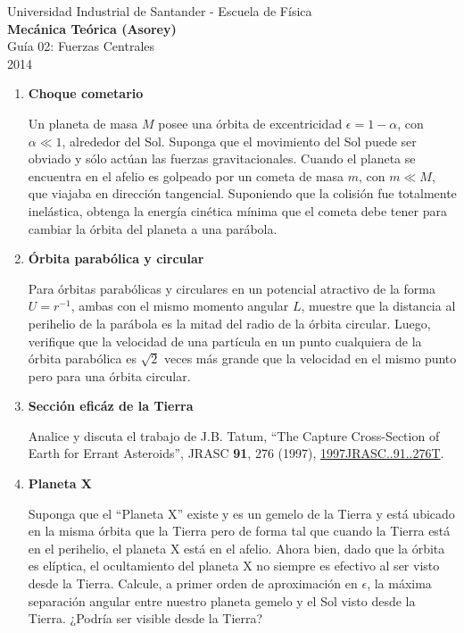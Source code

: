 \documentclass[a4paper,12pt]{article}
\begin{document}
\begin{center}
  {\small{Universidad Industrial de Santander - Escuela de Física}}\\
  {\bf{Mecánica Teórica (Asorey)}}\\
  \vspace{0.4cm}
  Guía 02: Fuerzas Centrales\\ 2014
\end{center}
\renewcommand{\labelenumi}{\arabic{enumi})}
\renewcommand{\labelenumii}{\arabic{enumii})}

\begin{enumerate}
  \item {\bf{Choque cometario}}

    Un planeta de masa $M$ posee una órbita de excentricidad $\epsilon = 1
    - \alpha$, con $\alpha \ll 1$, alrededor del Sol. Suponga que el
    movimiento del Sol puede ser obviado y sólo actúan las fuerzas
    gravitacionales. Cuando el planeta se encuentra en el afelio es
    golpeado por un cometa de masa $m$, con $m \ll M$, que viajaba en
    dirección tangencial. Suponiendo que la colisión fue totalmente
    inelástica, obtenga la energía cinética mínima que el cometa debe
    tener para cambiar la órbita del planeta a una parábola.

  \item {\bf{Órbita parabólica y circular}}

    Para órbitas parabólicas y circulares en un potencial atractivo de la
    forma $U=r^{-1}$, ambas con el mismo momento angular $L$, muestre que
    la distancia al perihelio de la parábola es la mitad del radio de la
    órbita circular. Luego, verifique que la velocidad de una partícula en
    un punto cualquiera de la órbita parabólica es $\sqrt{2}$ veces más
    grande que la velocidad en el mismo punto pero para una órbita
    circular.

  \item {\bf{Sección eficáz de la Tierra}}

    Analice y discuta el trabajo de J.B. Tatum, ``The Capture
    Cross-Section of Earth for Errant Asteroids'', JRASC {\bf 91}, 276
    (1997),
    \href{http://adsabs.harvard.edu/abs/1997JRASC..91..276T}{1997JRASC..91..276T}.

  \item {\bf{Planeta X}} \label{X}

    Suponga que el ``Planeta X'' existe y es un gemelo de la Tierra y está
    ubicado en la misma órbita que la Tierra pero de forma tal que cuando
    la Tierra está en el perihelio, el planeta X está en el afelio. Ahora
    bien, dado que la órbita es elíptica, el ocultamiento del planeta X no
    siempre es efectivo al ser visto desde la Tierra. Calcule, a primer
    orden de aproximación en $\epsilon$, la máxima separación angular
    entre nuestro planeta gemelo y el Sol visto desde la Tierra. ¿Podría
    ser visible desde la Tierra?


\end{enumerate}
\end{document}
